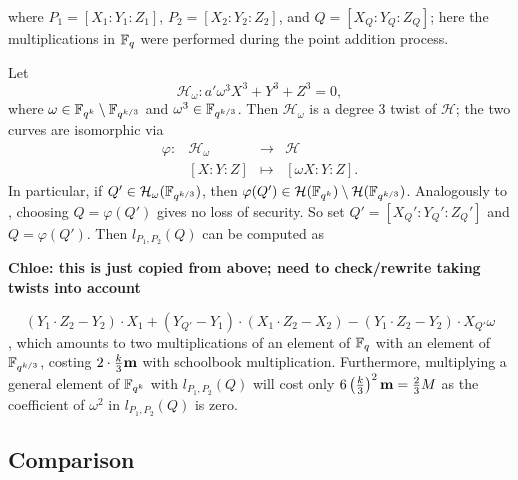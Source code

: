 where $P_1 = [X_1:Y_1:Z_1]$, $P_2 = [X_2:Y_2:Z_2]$, and $Q = [X_Q:Y_Q:Z_Q]$;
here the multiplications in $\mathbb{F}_{q}$ were performed during the point addition process.

Let
$$ \mathcal{H}_{\omega}: a' \omega^3 X^3 + Y^3 + Z^3 = 0, $$
where $\omega \in \mathbb{F}_{q^k} \setminus \mathbb{F}_{q^{k/3}}$ and $\omega^3 \in \mathbb{F}_{q^{k/3}}$.
Then $\mathcal{H}_{\omega}$ is a degree 3 twist of $\mathcal{H}$; the two curves are isomorphic via
\[\begin{array}{rccc}
\varphi: & \mathcal{H}_{\omega} & \rightarrow & \mathcal{H} \\
& [X:Y:Z] & \mapsto & [\omega X:Y:Z].
\end{array}\]
In particular, if $Q' \in \mathcal{H}_{\omega}(\mathbb{F}_{q^{k/3}})$, then
$\varphi(Q') \in \mathcal{H}(\mathbb{F}_{q^k}) \setminus \mathcal{H}(\mathbb{F}_{q^{k/3}})$.
Analogously to \cite{??}, choosing $Q = \varphi(Q')$ gives no loss of security.
So set $Q' = [X_Q':Y_Q':Z_Q']$ and $Q = \varphi(Q')$. 
Then $l_{P_1,P_2}(Q)$ can be computed as

\textbf{Chloe: this is just copied from above; need to check/rewrite taking twists into account}

$$ (Y_1 \cdot Z_2 - Y_2) \cdot X_1 + (Y_{Q'} - Y_1) \cdot (X_1 \cdot Z_2 - X_2) - (Y_1 \cdot Z_2 - Y_2) \cdot X_{Q'}\omega  $$,
which amounts to two multiplications of an element of $\mathbb{F}_{q}$ with an element of $\mathbb{F}_{q^{k/3}}$,
costing $2\cdot \frac{k}{3} \textbf{m}$ with schoolbook multiplication.
Furthermore, multiplying a general element of $\mathbb{F}_{q^k}$ with $l_{P_1,P_2}(Q)$ will cost only
$6 \left(\frac{k}{3}\right)^2 \textbf{m} = \frac{2}{3}M$ as the coefficient of $\omega^2$ in $l_{P_1,P_2}(Q)$ is zero.



\subsection{Comparison}


